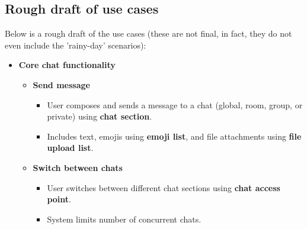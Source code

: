 \documentclass[]{VUMIFTemplateClass}
\begin{document}
\subsection{Rough draft of use cases}
Below is a rough draft of the use cases (these are not final, in fact, they do not even include the 'rainy-day' scenarios):
\begin{itemize}
    \item \textbf{Core chat functionality}
    \begin{itemize}
        \item \textbf{Send message}
        \begin{itemize}
            \item User composes and sends a message to a chat (global, room, group, or private) using \textbf{chat section}.
            \item Includes text, emojis using \textbf{emoji list}, and file attachments using \textbf{file upload list}.
        \end{itemize}
        \item \textbf{Switch between chats}
        \begin{itemize}
            \item User switches between different chat sections using \textbf{chat access point}.
            \item System limits number of concurrent chats.
        \end{itemize}
    \end{itemize}


\end{itemize}
\end{document}
